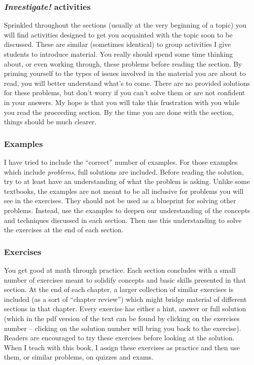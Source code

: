 \subsubsection*{\textit{Investigate!} activities}  Sprinkled throughout the sections (usually at the very beginning of a topic) you will find activities designed to get you acquainted with the topic soon to be discussed.  These are similar (sometimes identical) to group activities I give students to introduce material.  You really should spend some time thinking about, or even working through, these problems before reading the section.  By priming yourself to the types of issues involved in the material you are about to read, you will better understand what's to come.  There are no provided solutions for these problems, but don't worry if you can't solve them or are not confident in your answers.  My hope is that you will take this frustration with you while you read the proceeding section.  By the time you are done with the section, things should be much clearer.

\subsubsection*{Examples}

I have tried to include the ``correct'' number of examples.  For those examples which include \emph{problems}, full solutions are included. Before reading the solution, try to at least have an understanding of what the problem is asking.  Unlike some textbooks, the examples are not meant to be all inclusive for problems you will see in the exercises.  They should not be used as a blueprint for solving other problems.  Instead, use the examples to deepen our understanding of the concepts and techniques discussed in each section.  Then use this understanding to solve the exercises at the end of each section.

\subsubsection*{Exercises}

You get good at math through practice.  Each section concludes with a small number of exercises meant to solidify concepts and basic skills presented in that section.  At the end of each chapter, a larger collection of similar exercises is included (as a sort of ``chapter review'') which might bridge material of different sections in that chapter.  Every exercise has either a hint, answer or full solution (which in the pdf version of the text can be found by clicking on the exercises number -- clicking on the solution number will bring you back to the exercise).  Readers are encouraged to try these exercises before looking at the solution.  When I teach with this book, I assign these exercises as practice and then use them, or similar problems, on quizzes and exams.

